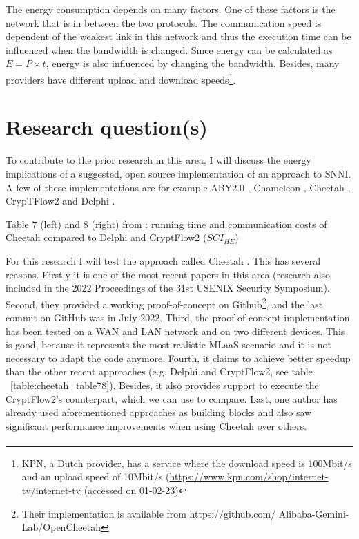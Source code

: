 \documentclass[../thesis.tex]{subfiles}
\begin{document}
The energy consumption depends on many factors. One of these factors is the network that is in between the two protocols. The communication speed is dependent of the weakest link in this network and thus the execution time can be influenced when the bandwidth is changed. Since energy can be calculated as $E=P\times t$, energy is also influenced by changing the bandwidth. Besides, many providers have different upload and download speeds\footnote{KPN, a Dutch provider, has a service where the download speed is 100Mbit/s and an upload speed of 10Mbit/s (\url{https://www.kpn.com/shop/internet-tv/internet-tv} (accessed on 01-02-23)}. 

\section{Research question(s)}
To contribute to the prior research in this area, I will discuss the energy implications of a suggested, open source implementation of an approach to SNNI. A few of these implementations are for example ABY2.0 \parencite{aby20}, Chameleon \parencite{chameleon}, Cheetah \parencite{cheetah}, CrypTFlow2 \parencite{cryptflow2} and Delphi \parencite{delphi}. 

\begin{table}
    \begin{adjustbox}{width=\columnwidth,center}
        
        \quad
        
    \end{adjustbox}
    \caption{Table 7 (left) and 8 (right) from \parencite[p. 821]{cheetah}: running time and communication costs of Cheetah compared to Delphi and CryptFlow2 (\textit{${SCI}_{HE}$})}
    \label{table:cheetah_table78}
\end{table}

For this research I will test the approach called Cheetah \parencite{cheetah}. This has several reasons. Firstly it is one of the most recent papers in this area (research also included in the 2022 Proceedings of the 31st USENIX Security Symposium). Second, they provided a working proof-of-concept on Github\footnote{Their implementation is available from https://github.com/
Alibaba-Gemini-Lab/OpenCheetah}, and the last commit on GitHub was in July 2022. Third, the proof-of-concept implementation has been tested on a WAN and LAN network and on two different devices. This is good, because it represents the most realistic MLaaS scenario \parencite{ribeiro2015mlaasml} and it is not necessary to adapt the code anymore. Fourth, it claims to achieve better speedup than the other recent approaches (e.g. Delphi and CryptFlow2, see table ~\ref{table:cheetah_table78}). Besides, it also provides support to execute the CryptFlow2's counterpart, which we can use to compare. Last, one author \parencite{dong2022} has already used aforementioned approaches as building blocks and also saw significant performance improvements when using Cheetah over others. \paragraph{}
\end{document}
